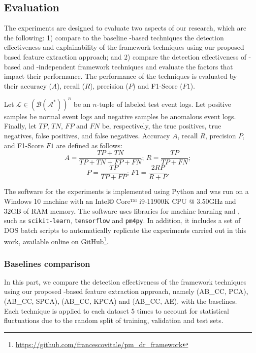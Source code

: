 \subsection{Evaluation}
The experiments are designed to evaluate two aspects of our research, which are the following: 1) compare to the baseline -based techniques the detection effectiveness and explainability of the framework techniques using our proposed -based feature extraction approach; and 2) compare the detection effectiveness of -based and -independent framework techniques and evaluate the factors that impact their performance. The performance of the techniques is evaluated by their accuracy ($A$), recall ($R$), precision ($P$) and F1-Score ($F1$).
\begin{definition}
Let $\mathcal{L}\in(\mathcal{B}(\mathcal{A}^*))^n$ be an $n$-tuple of labeled test event logs. Let positive samples be normal event logs and negative samples be anomalous event logs. Finally, let $TP$, $TN$, $FP$ and $FN$ be, respectively, the true positives, true negatives, false positives, and false negatives. Accuracy $A$, recall $R$, precision $P$, and F1-Score $F1$ are defined as follows:
\begin{equation*}
A=\frac{TP+TN}{TP+TN+FP+FN};\,R=\frac{TP}{TP+FN};
\end{equation*}
\begin{equation}
    P=\frac{TP}{TP+FP};\,F1=\frac{2RP}{R+P}.
\end{equation}
\end{definition}

The software for the experiments is implemented using Python and was run on a Windows 10 machine with an Intel® Core™ i9-11900K CPU @ 3.50GHz and 32GB of RAM memory. The software uses libraries for machine learning and , such as \texttt{scikit-learn}, \texttt{tensorflow} and \texttt{pm4py}. In addition, it includes a set of DOS batch scripts to automatically replicate the experiments carried out in this work, available online on GitHub\footnote{\url{https://github.com/francescovitale/pm_dr_framework}}.

\subsubsection{Baselines comparison}
In this part, we compare the detection effectiveness of the framework techniques using our proposed -based feature extraction approach, namely (AB\_CC, PCA), (AB\_CC, SPCA), (AB\_CC, KPCA) and (AB\_CC, AE), with the baselines. Each technique is applied to each dataset 5 times to account for statistical fluctuations due to the random split of training, validation and test sets.


